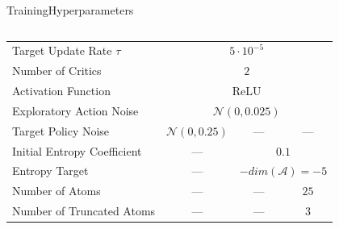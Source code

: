\begin{frame}{Training}{Hyperparameters}
\begin{columns}
\begin{column}{0.7\textwidth}
{\begin{tabular}{l|ccc}
                    Target Update Rate \(\tau\) & \multicolumn{3}{c}{\(5 \cdot 10^{-5}\)}                                                                                       \\
                    Number of Critics           & \multicolumn{3}{c}{\(2\)}                                                                                                     \\
                    Activation Function         & \multicolumn{3}{c}{ReLU}                                                                                                      \\
                    Exploratory Action Noise    & \multicolumn{3}{c}{\(\mathcal{N}(0, 0.025)\)}                                                                                 \\ \hline
                    Target Policy Noise         & \(\mathcal{N}(0, 0.25)\)                                        & ---                                          & ---          \\ \hline
                    Initial Entropy Coefficient & ---                                                             & \multicolumn{2}{c}{\(0.1\)}                                 \\
                    Entropy Target              & ---                                                             & \multicolumn{2}{c}{\(-dim(\mathcal{A})=-5\)}                \\ \hline
                    Number of Atoms             & ---                                                             & ---                                          & \(25\)       \\
                    Number of Truncated Atoms   & ---                                                             & ---                                          & \(3\)        \\
                \end{tabular}
            }
        \end{column}
    \end{columns}
\end{frame}


